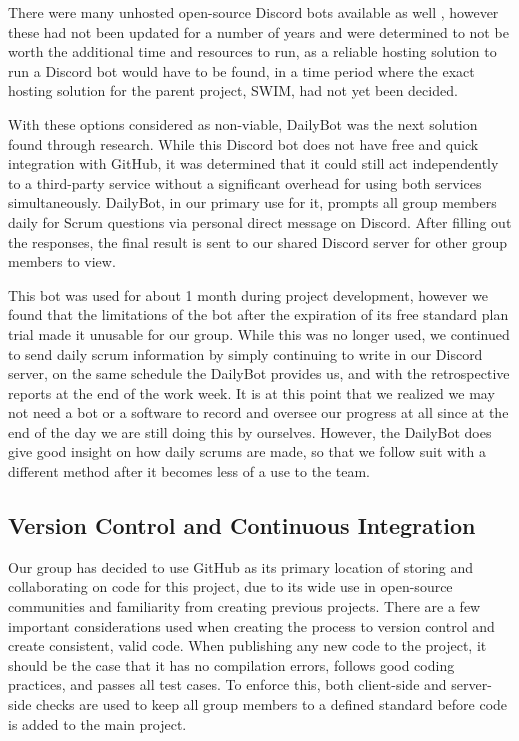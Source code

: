 \documentclass[
    paper=letter,
    parskip=half,
    fontsize=12pt,
    titlepage=firstiscover,
    toc=bibliography,
    numbers=endperiod
]{scrartcl}
\begin{document}
There were many unhosted open-source Discord bots available as well
\cite{austen-scrum-bot, navn-standup-bot, fijter-standup-bot,
    vivek-scrum-bot}, however these had not been updated for a number of
years and were determined to not be worth the additional time and
resources to run, as a reliable hosting solution to run a Discord bot
would have to be found, in a time period where the exact hosting
solution for the parent project, SWIM, had not yet been decided.

With these options considered as non-viable, DailyBot \cite{dailybot}
was the next solution found through research. While this Discord bot
does not have free and quick integration with GitHub, it was determined
that it could still act independently to a third-party service without a
significant overhead for using both services simultaneously. DailyBot,
in our primary use for it, prompts all group members daily for Scrum
questions via personal direct message on Discord. After filling out the
responses, the final result is sent to our shared Discord server for
other group members to view.

This bot was used for about 1 month during project development, however
we found that the limitations of the bot after the expiration of its
free standard plan trial made it unusable for our group. While this was
no longer used, we continued to send daily scrum information by simply
continuing to write in our Discord server, on the same schedule the
DailyBot provides us, and with the retrospective reports at the end of
the work week. It is at this point that we realized we may not need a
bot or a software to record and oversee our progress at all since at the
end of the day we are still doing this by ourselves. However, the
DailyBot does give good insight on how daily scrums are made, so that we
follow suit with a different method after it becomes less of a use to
the team.

\subsection{Version Control and Continuous Integration}
\label{subsec:version-control-and-ci}

Our group has decided to use GitHub as its primary location of storing
and collaborating on code for this project, due to its wide use in
open-source communities and familiarity from creating previous projects.
There are a few important considerations used when creating the process
to version control and create consistent, valid code. When publishing
any new code to the project, it should be the case that it has no
compilation errors, follows good coding practices, and passes all test
cases. To enforce this, both client-side and server-side checks are used
to keep all group members to a defined standard before code is added to
the main project.
\end{document}
